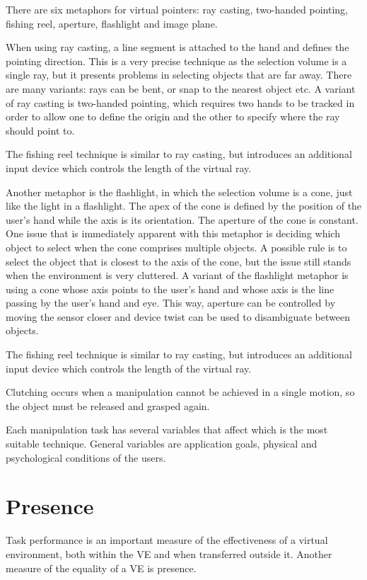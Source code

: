 \documentclass[a4paper]{article}
\begin{document}
There are six metaphors for virtual pointers: ray casting, two-handed
pointing, fishing reel, aperture, flashlight and image plane.

When using ray casting, a line segment is attached to the hand and
defines the pointing direction. This is a very precise technique as the
selection volume is a single ray, but it presents problems in selecting
objects that are far away. There are many variants: rays can be bent, or
snap to the nearest object etc. A variant of ray casting is two-handed
pointing, which requires two hands to be tracked in order to allow one
to define the origin and the other to specify where the ray should point
to.

The fishing reel technique is similar to ray casting, but introduces an
additional input device which controls the length of the virtual ray.

Another metaphor is the flashlight, in which the selection volume is a
cone, just like the light in a flashlight. The apex of the cone is
defined by the position of the user's hand while the axis is its
orientation. The aperture of the cone is constant. One issue that is
immediately apparent with this metaphor is deciding which object to
select when the cone comprises multiple objects. A possible rule is to
select the object that is closest to the axis of the cone, but the issue
still stands when the environment is very cluttered. A variant of the
flashlight metaphor is using a cone whose axis points to the user's hand
and whose axis is the line passing by the user's hand and eye. This way,
aperture can be controlled by moving the sensor closer and device twist
can be used to disambiguate between objects.

The fishing reel technique is similar to ray casting, but introduces an
additional input device which controls the length of the virtual ray.

Clutching occurs when a manipulation cannot be achieved in a single
motion, so the object must be released and grasped again.

Each manipulation task has several variables that affect which is the
most suitable technique. General variables are application goals,
physical and psychological conditions of the users.


\section{Presence}

Task performance is an important measure of the effectiveness of a
virtual environment, both within the VE and when transferred outside it.
Another measure of the equality of a VE is presence.
\end{document}
